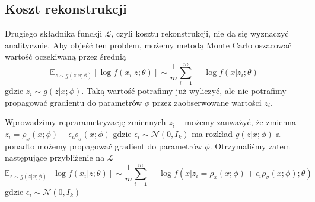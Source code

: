 \documentclass{iithesis}
\begin{document}
\subsection{Koszt rekonstrukcji} \label{sec:rec_loss_normal}
Drugiego składnika funckji $\mathcal{L}$, czyli kosztu rekonstrukcji,
nie da się wyznaczyć analitycznie. Aby objeść ten problem, możemy metodą Monte Carlo
oszacować wartość oczekiwaną przez średnią
$$
\mathbb{E}_{z\sim g(z|x;\phi)}\left[\log f(x_i|z;\theta)\right] \sim
\frac{1}{m} \sum_{i=1}^m -\log f(x|z_i;\theta)
$$
gdzie $z_i \sim g(z|x;\phi)$. Taką wartość potrafimy już wyliczyć, ale nie
potrafimy propagować gradientu do parametrów $\phi$ przez
zaobserwowane wartości $z_i$.

Wprowadzimy repearametryzację zmiennych $z_i$ -- możemy zauważyć, że zmienna
$z_i=\rho_x(x;\phi)+\epsilon_i\rho_\sigma(x;\phi)$
gdzie $\epsilon_i \sim \mathcal{N}(0, I_k)$
ma rozkład $g(z|x;\phi)$ a ponadto możemy propagować gradient do parametrów $\phi$.
Otrzymaliśmy zatem następujące przybliżenie na $\mathcal{L}$
$$
\mathbb{E}_{z\sim g(z|x;\phi)}\left[\log f(x_i|z;\theta)\right] \sim
\frac{1}{m} \sum_{i=1}^m -\log f(x|z_i=\rho_x(x;\phi)+\epsilon_i\rho_\sigma(x;\phi);\theta)
$$
gdzie $\epsilon_i \sim \mathcal{N}(0, I_k)$
\end{document}
